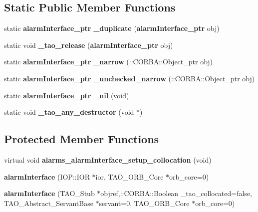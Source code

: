 \subsection*{Static Public Member Functions}
\begin{DoxyCompactItemize}
\item 
static {\bf alarm\+Interface\+\_\+ptr} {\bfseries \+\_\+duplicate} ({\bf alarm\+Interface\+\_\+ptr} obj)\label{interfacealarms_1_1alarmInterface_abb4ba138d926285a7c26d80f29927a57}

\item 
static void {\bfseries \+\_\+tao\+\_\+release} ({\bf alarm\+Interface\+\_\+ptr} obj)\label{interfacealarms_1_1alarmInterface_a092717ed825c4e4ca3a39ca51a3a2fc1}

\item 
static {\bf alarm\+Interface\+\_\+ptr} {\bfseries \+\_\+narrow} (\+::C\+O\+R\+B\+A\+::\+Object\+\_\+ptr obj)\label{interfacealarms_1_1alarmInterface_a33866fec27453edc312186145fd7673c}

\item 
static {\bf alarm\+Interface\+\_\+ptr} {\bfseries \+\_\+unchecked\+\_\+narrow} (\+::C\+O\+R\+B\+A\+::\+Object\+\_\+ptr obj)\label{interfacealarms_1_1alarmInterface_a4291332dfb2a2a64f5ce8e7e028568a3}

\item 
static {\bf alarm\+Interface\+\_\+ptr} {\bfseries \+\_\+nil} (void)\label{interfacealarms_1_1alarmInterface_a16ba33b0ae104eb1326bd1cc7623d5bc}

\item 
static void {\bfseries \+\_\+tao\+\_\+any\+\_\+destructor} (void $\ast$)\label{interfacealarms_1_1alarmInterface_a3f118c973be4253bb5b03dc8563f67a6}

\end{DoxyCompactItemize}
\subsection*{Protected Member Functions}
\begin{DoxyCompactItemize}
\item 
virtual void {\bfseries alarms\+\_\+alarm\+Interface\+\_\+setup\+\_\+collocation} (void)\label{interfacealarms_1_1alarmInterface_a24d39a26c1fe4630d1b953598c499278}

\item 
{\bfseries alarm\+Interface} (I\+O\+P\+::\+I\+OR $\ast$ior, T\+A\+O\+\_\+\+O\+R\+B\+\_\+\+Core $\ast$orb\+\_\+core=0)\label{interfacealarms_1_1alarmInterface_ab375139b64552b32c2fb41b9ff6e50b0}

\item 
{\bfseries alarm\+Interface} (T\+A\+O\+\_\+\+Stub $\ast$objref,\+::C\+O\+R\+B\+A\+::\+Boolean \+\_\+tao\+\_\+collocated=false, T\+A\+O\+\_\+\+Abstract\+\_\+\+Servant\+Base $\ast$servant=0, T\+A\+O\+\_\+\+O\+R\+B\+\_\+\+Core $\ast$orb\+\_\+core=0)\label{interfacealarms_1_1alarmInterface_aa5c5fa3a9b0fe6118ac8848b824a068b}

\end{DoxyCompactItemize}
